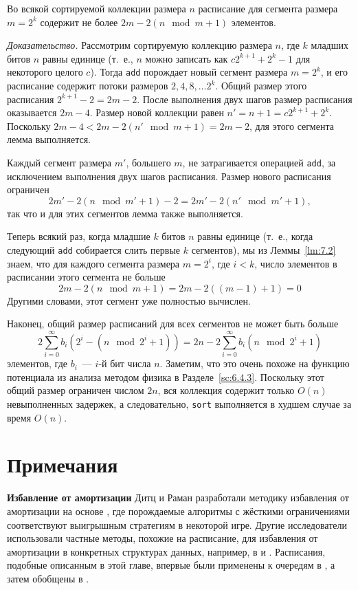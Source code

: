 \begin{lemma}\label{lm:7.2}
  Во всякой сортируемой коллекции размера $n$ расписание для сегмента
  размера $m = 2^k$ содержит не более $2m - 2(n \mod m + 1)$ элементов.

  \emph{Доказательство.} Рассмотрим сортируемую коллекцию размера $n$,
где $k$ младших битов $n$ равны единице (т.~е., $n$ можно записать как
$c2^{k+1} + 2^k -1$ для некоторого целого $c$). Тогда \lstinline!add!
порождает новый сегмент размера $m = 2^k$, и его расписание содержит
потоки размеров $2, 4, 8, \ldots 2^k$. Общий размер этого расписания
$2^{k+1} - 2 = 2m - 2$. После выполнения двух шагов размер расписания
оказывается $2m - 4$. Размер новой коллекции равен $n' = n + 1 =
c2^{k+1} + 2^k$. Поскольку $2m - 4  < 2m - 2(n' \mod m + 1) = 2m - 2$,
для этого сегмента лемма выполняется.

Каждый сегмент размера $m'$, большего $m$, не затрагивается операцией
\lstinline!add!, за исключением выполнения двух шагов
расписания. Размер нового расписания ограничен
$$
2m' - 2(n \mod m' + 1) - 2 = 2m' - 2(n' \mod m' + 1),
$$
так что и для этих сегментов лемма также выполняется.
\end{lemma}

Теперь всякий раз, когда младшие $k$ битов $n$ равны единице (т.~е.,
когда следующий \lstinline!add! собирается слить первые $k$
сегментов), мы из Леммы~\ref{lm:7.2} знаем, что для каждого сегмента
размера $m = 2^i$, где $i < k$, число элементов в расписании этого
сегмента не больше
$$
2m -2(n \mod m + 1) = 2m - 2((m-1) + 1) = 0
$$
Другими словами, этот сегмент уже полностью вычислен.

Наконец, общий размер расписаний для всех сегментов не может быть
больше
$$
2 \sum_{i=0}^\infty b_i(2^i - (n \mod 2^i + 1)) = 2n - 2 \sum_{i=0}^\infty b_i (n \mod 2^i + 1)
$$
элементов, где $b_i$~--- $i$-й бит числа $n$. Заметим, что это очень
похоже на функцию потенциала из анализа методом физика в
Разделе~\ref{sc:6.4.3}. Поскольку этот общий размер ограничен числом
$2n$, вся коллекция содержит только $O(n)$ невыполненных задержек, а
следовательно, \lstinline!sort! выполняется в худшем случае за время
$O(n)$.

\section{Примечания}
\label{sc:7.5}

\noindent
\textbf{Избавление от амортизации}
Дитц и Раман \cite{DietzRaman1991, DietzRaman1993, Raman1995}
разработали методику избавления от амортизации на основе
, где порождаемые алгоритмы с
жёсткими ограничениями соответствуют выигрышным стратегиям в некоторой
игре. Другие исследователи использовали частные методы, похожие на
расписание, для избавления от амортизации в конкретных структурах
данных, например, в  \cite{CarlssonMunroPoblete1988} и
\cite{Driscolletal1988}. Расписания, подобные описанным в этой главе,
впервые были применены к очередям в \cite{Okasaki1995c}, а затем
обобщены в \cite{Okasaki1996b}.

